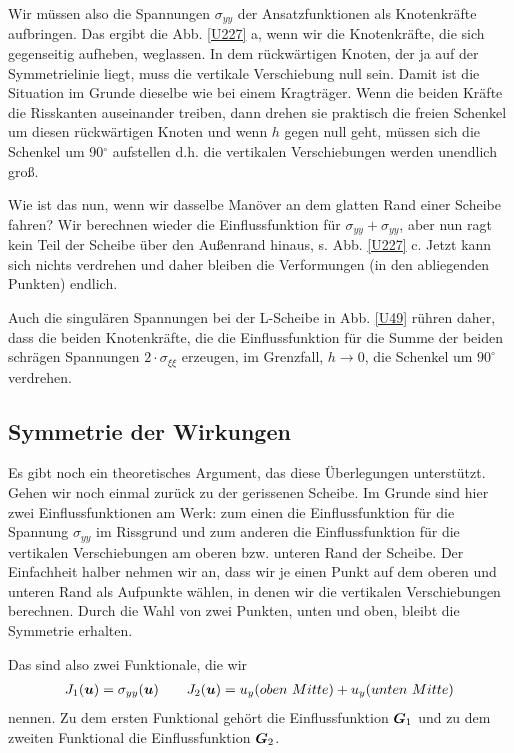 Wir m\"{u}ssen also die Spannungen $\sigma_{yy} $ der Ansatzfunktionen als Knotenkr\"{a}fte aufbringen. Das ergibt die Abb. \ref{U227} a, wenn wir die Knotenkr\"{a}fte, die sich gegenseitig aufheben, weglassen. In dem r\"{u}ckw\"{a}rtigen Knoten, der ja auf der Symmetrielinie liegt, muss die vertikale Verschiebung null sein. Damit ist die Situation im Grunde dieselbe wie bei einem Kragtr\"{a}ger. Wenn die beiden Kr\"{a}fte die Risskanten auseinander treiben, dann drehen sie praktisch die freien Schenkel um diesen r\"{u}ckw\"{a}rtigen Knoten und wenn $h $ gegen null geht, m\"{u}ssen sich die Schenkel um 90$^\circ$ aufstellen d.h. die vertikalen Verschiebungen werden unendlich gro{\ss}.

Wie ist das nun, wenn wir dasselbe Man\"{o}ver an dem glatten Rand einer Scheibe fahren? Wir berechnen wieder die Einflussfunktion f\"{u}r $\sigma_{yy} + \sigma_{yy} $, aber nun ragt kein Teil der Scheibe \"{u}ber den Au{\ss}enrand hinaus, s. Abb. \ref{U227} c. Jetzt kann sich nichts verdrehen und daher bleiben die Verformungen (in den abliegenden Punkten) endlich.

Auch die singul\"{a}ren Spannungen bei der L-Scheibe in Abb. \ref{U49} r\"{u}hren daher, dass die beiden Knotenkr\"{a}fte, die die Einflussfunktion f\"{u}r die Summe der beiden schr\"{a}gen Spannungen $2 \cdot \sigma_{\xi\xi}$ erzeugen, im Grenzfall, $h \to 0 $, die Schenkel um $90^\circ $ verdrehen.

\textcolor{sectionTitleBlue}{\section{Symmetrie der Wirkungen}}\label{Symmetrie der Wirkungen}
Es gibt noch ein theoretisches Argument, das diese \"{U}berlegungen unterst\"{u}tzt. Gehen wir noch einmal zur\"{u}ck zu der gerissenen Scheibe. Im Grunde sind hier zwei Einflussfunktionen am Werk: zum einen die Einflussfunktion f\"{u}r die Spannung $\sigma_{yy} $ im Rissgrund und zum anderen die Einflussfunktion f\"{u}r die vertikalen Verschiebungen am oberen bzw. unteren Rand der Scheibe. Der Einfachheit halber nehmen wir an, dass wir je einen Punkt auf dem oberen und unteren Rand als Aufpunkte w\"{a}hlen, in denen wir die vertikalen Verschiebungen berechnen. Durch die Wahl von zwei Punkten, unten und oben, bleibt die Symmetrie erhalten.

Das sind also zwei Funktionale, die wir
\begin{align}
J_1(\mbox{\boldmath $u$}) = \sigma_{yy}(\mbox{\boldmath $u$}) \qquad J_2(\mbox{\boldmath $u$}) = u_y(oben \,\,Mitte) + u_y(unten\,\, Mitte)
\end{align}
nennen. Zu dem ersten Funktional geh\"{o}rt die Einflussfunktion $\mbox{\boldmath $G$}_1$ und zu dem zweiten Funktional die Einflussfunktion $\mbox{\boldmath $G$}_2$.


